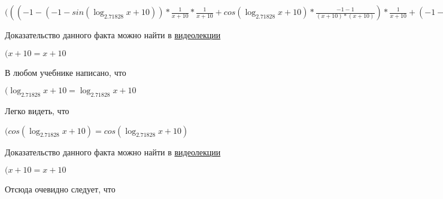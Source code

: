 \documentclass[12pt,a4paper,fleqn]{article}
\theoremstyle{definition}
\begin{document}
$((( -1  - ( -1  - sin(\log_{ 2.71828 }{ x  +  10 })) * \frac{ 1 }{ x  +  10 }
 * \frac{ 1 }{ x  +  10 }
 + cos(\log_{ 2.71828 }{ x  +  10 }) * \frac{ -1  -  1 }{( x  +  10 ) * ( x  +  10 )}
) * \frac{ 1 }{ x  +  10 }
 + ( -1  - cos(\log_{ 2.71828 }{ x  +  10 }) * \frac{ 1 }{ x  +  10 }
) * \frac{ -1  -  1 }{( x  +  10 ) * ( x  +  10 )}
 + ( -1  - cos(\log_{ 2.71828 }{ x  +  10 }) * \frac{ 1 }{ x  +  10 }
) * \frac{ -2 }{( x  +  10 ) * ( x  +  10 )}
 + ( -1  - sin(\log_{ 2.71828 }{ x  +  10 })) * \frac{ -1  -  -2  * ( x  +  10  +  x  +  10 )}{( x  +  10 ) * ( x  +  10 ) * ( x  +  10 ) * ( x  +  10 )}
) * \frac{ 1 }{ x  +  10 }
 + (( -1  - cos(\log_{ 2.71828 }{ x  +  10 }) * \frac{ 1 }{ x  +  10 }
) * \frac{ 1 }{ x  +  10 }
 + ( -1  - sin(\log_{ 2.71828 }{ x  +  10 })) * \frac{ -2 }{( x  +  10 ) * ( x  +  10 )}
) * \frac{ -1  -  1 }{( x  +  10 ) * ( x  +  10 )}
 = (( -1  - ( -1  - sin(\log_{ 2.71828 }{ x  +  10 })) * \frac{ 1 }{ x  +  10 }
 * \frac{ 1 }{ x  +  10 }
 + cos(\log_{ 2.71828 }{ x  +  10 }) * \frac{ -1  -  1 }{( x  +  10 ) * ( x  +  10 )}
) * \frac{ 1 }{ x  +  10 }
 + ( -1  - cos(\log_{ 2.71828 }{ x  +  10 }) * \frac{ 1 }{ x  +  10 }
) * \frac{ -1  -  1 }{( x  +  10 ) * ( x  +  10 )}
 + ( -1  - cos(\log_{ 2.71828 }{ x  +  10 }) * \frac{ 1 }{ x  +  10 }
) * \frac{ -2 }{( x  +  10 ) * ( x  +  10 )}
 + ( -1  - sin(\log_{ 2.71828 }{ x  +  10 })) * \frac{ -1  -  -2  * ( x  +  10  +  x  +  10 )}{( x  +  10 ) * ( x  +  10 ) * ( x  +  10 ) * ( x  +  10 )}
) * \frac{ 1 }{ x  +  10 }
 + (( -1  - cos(\log_{ 2.71828 }{ x  +  10 }) * \frac{ 1 }{ x  +  10 }
) * \frac{ 1 }{ x  +  10 }
 + ( -1  - sin(\log_{ 2.71828 }{ x  +  10 })) * \frac{ -2 }{( x  +  10 ) * ( x  +  10 )}
) * \frac{ -1  -  1 }{( x  +  10 ) * ( x  +  10 )}
$

Доказательство данного факта можно найти в \href{https://www.youtube.com/watch?v=dQw4w9WgXcQ}{видеолекции}

$( x  +  10  =  x  +  10 $

В любом учебнике написано, что

$(\log_{ 2.71828 }{ x  +  10 } = \log_{ 2.71828 }{ x  +  10 }$

Легко видеть, что

$(cos(\log_{ 2.71828 }{ x  +  10 }) = cos(\log_{ 2.71828 }{ x  +  10 })$

Доказательство данного факта можно найти в \href{https://www.youtube.com/watch?v=dQw4w9WgXcQ}{видеолекции}

$( x  +  10  =  x  +  10 $

Отсюда очевидно следует, что
\end{document}
